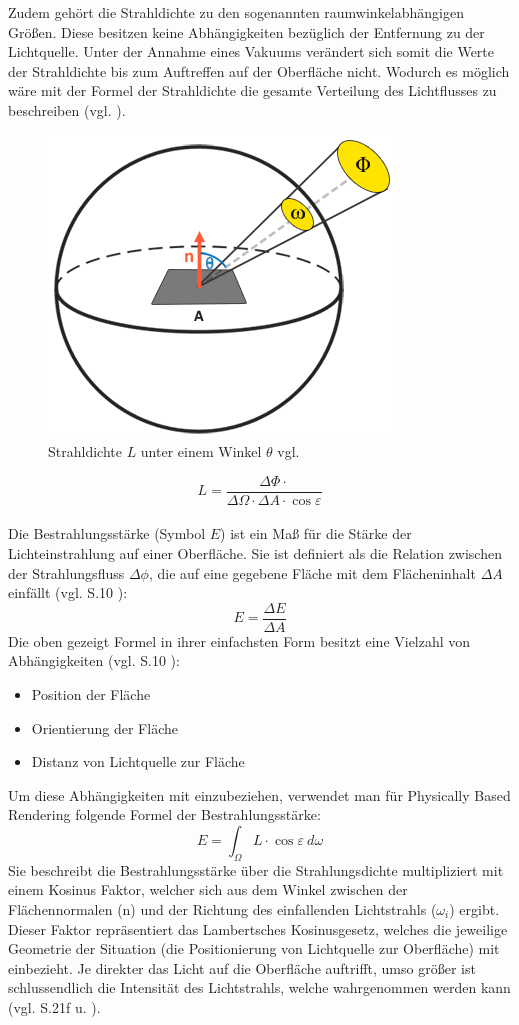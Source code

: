 \documentclass[
  11pt,
  a4paper,
  oneside
  ]{article}
\begin{document}
Zudem gehört die Strahldichte zu den sogenannten raumwinkelabhängigen Größen. Diese besitzen keine Abhängigkeiten bezüglich der Entfernung zu der Lichtquelle. Unter der Annahme eines Vakuums verändert sich somit die Werte der Strahldichte bis zum Auftreffen auf der Oberfläche nicht. Wodurch es möglich wäre mit der Formel der Strahldichte die gesamte Verteilung des Lichtflusses zu beschreiben
(vgl. \cite{gMueller}).  
\begin{figure}[H]
  \centering
  \includegraphics*[width=0.35 \textwidth]{images/radiance.png}
  \caption{Strahldichte $L$ unter einem Winkel $\theta$ vgl. \cite{learnOpenGL}}
  \label{fig:img4}
\end{figure}
\begin{equation}
  L=\dfrac{\Delta \Phi \cdot }{\Delta \Omega \cdot \Delta A\cdot \cos \varepsilon } 
\end{equation}
\\
Die Bestrahlungsstärke (Symbol $E$) ist ein Maß für die Stärke der Lichteinstrahlung auf einer Oberfläche. Sie ist definiert als die Relation zwischen der Strahlungsfluss $\Delta \phi$, die auf eine gegebene Fläche mit dem Flächeninhalt $\Delta A$ einfällt 
(vgl. S.10 \cite{GrundlagenLichtTechnik}):
\begin{equation}
  E=\dfrac{\Delta E}{\Delta A}
\end{equation}
Die oben gezeigt Formel in ihrer einfachsten Form besitzt eine Vielzahl von Abhängigkeiten (vgl. S.10 \cite{GrundlagenLichtTechnik}):
\begin{itemize}
  \item Position der Fläche
  \item Orientierung der Fläche
  \item Distanz von Lichtquelle zur Fläche
\end{itemize}

Um diese Abhängigkeiten mit einzubeziehen, verwendet man für Physically Based Rendering folgende Formel der Bestrahlungsstärke: 
\begin{equation}
  E=\int _{\Omega }L\cdot \cos \varepsilon \ d\omega
\end{equation}
Sie beschreibt die Bestrahlungsstärke über die Strahlungsdichte multipliziert mit einem Kosinus Faktor, welcher sich aus dem Winkel zwischen der Flächennormalen (n) und der Richtung des einfallenden Lichtstrahls ($\omega_{i}$) ergibt. Dieser Faktor repräsentiert das Lambertsches Kosinusgesetz, welches die jeweilige Geometrie der Situation (die Positionierung von Lichtquelle zur Oberfläche) mit einbezieht. Je direkter das Licht auf die Oberfläche auftrifft, umso größer ist schlussendlich die Intensität des Lichtstrahls, welche wahrgenommen werden kann 
(vgl. S.21f \cite{GRAY197813} u. \cite{Ryer97lightmeasurement,renderingEquationArticle}).
\end{document}
